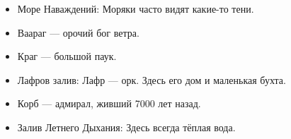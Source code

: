 \documentclass[12pt,a4paper]{book}
\begin{document}
\begin{itemize}
\item Море Наваждений: Моряки часто видят какие-то тени.
\item Ваараг --- орочий бог ветра.
\item Краг --- большой паук.
\item Лафров залив: Лафр --- орк. Здесь его дом и маленькая бухта.
\item Корб --- адмирал, живший 7000 лет назад.
\item Залив Летнего Дыхания: Здесь всегда тёплая вода.
\end{itemize}
\end{document}
